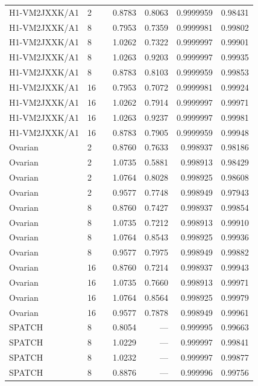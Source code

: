 {\begin{table}[H]
\begin{tabular}{llllrrr}
H1-VM2JXXK/A1 & 2 & \policyGated{} & 0.8783 & 0.8063 & 0.9999959 & 0.98431 \\
H1-VM2JXXK/A1 & 8 & \policyStrict{} & 0.7953 & 0.7359 & 0.9999981 & 0.99802 \\
H1-VM2JXXK/A1 & 8 & \policySoft{} & 1.0262 & 0.7322 & 0.9999997 & 0.99901 \\
H1-VM2JXXK/A1 & 8 & \policyHard{} & 1.0263 & 0.9203 & 0.9999997 & 0.99935 \\
H1-VM2JXXK/A1 & 8 & \policyGated{} & 0.8783 & 0.8103 & 0.9999959 & 0.99853 \\
H1-VM2JXXK/A1 & 16 & \policyStrict{} & 0.7953 & 0.7072 & 0.9999981 & 0.99924 \\
H1-VM2JXXK/A1 & 16 & \policySoft{} & 1.0262 & 0.7914 & 0.9999997 & 0.99971 \\
H1-VM2JXXK/A1 & 16 & \policyHard{} & 1.0263 & 0.9237 & 0.9999997 & 0.99981 \\
H1-VM2JXXK/A1 & 16 & \policyGated{} & 0.8783 & 0.7905 & 0.9999959 & 0.99948 \\
Ovarian & 2 & \policyStrict{} & 0.8760 & 0.7633 & 0.998937 & 0.98186 \\
Ovarian & 2 & \policySoft{} & 1.0735 & 0.5881 & 0.998913 & 0.98429 \\
Ovarian & 2 & \policyHard{} & 1.0764 & 0.8028 & 0.998925 & 0.98608 \\
Ovarian & 2 & \policyGated{} & 0.9577 & 0.7748 & 0.998949 & 0.97943 \\
Ovarian & 8 & \policyStrict{} & 0.8760 & 0.7427 & 0.998937 & 0.99854 \\
Ovarian & 8 & \policySoft{} & 1.0735 & 0.7212 & 0.998913 & 0.99910 \\
Ovarian & 8 & \policyHard{} & 1.0764 & 0.8543 & 0.998925 & 0.99936 \\
Ovarian & 8 & \policyGated{} & 0.9577 & 0.7975 & 0.998949 & 0.99882 \\
Ovarian & 16 & \policyStrict{} & 0.8760 & 0.7214 & 0.998937 & 0.99943 \\
Ovarian & 16 & \policySoft{} & 1.0735 & 0.7660 & 0.998913 & 0.99971 \\
Ovarian & 16 & \policyHard{} & 1.0764 & 0.8564 & 0.998925 & 0.99979 \\
Ovarian & 16 & \policyGated{} & 0.9577 & 0.7878 & 0.998949 & 0.99961 \\
SPATCH & 8 & \policyStrict{} & 0.8054 & --- & 0.999995 & 0.99663 \\
SPATCH & 8 & \policySoft{} & 1.0229 & --- & 0.999997 & 0.99841 \\
SPATCH & 8 & \policyHard{} & 1.0232 & --- & 0.999997 & 0.99877 \\
SPATCH & 8 & \policyGated{} & 0.8876 & --- & 0.999996 & 0.99756 \\
\bottomrule
\end{tabular}
\end{table}
}

